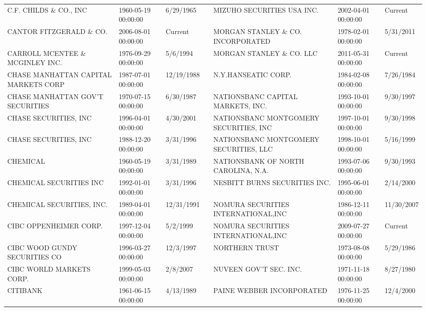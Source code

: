 \documentclass{article}
\begin{document}
\begin{tabular}{lllllll}
C.F. CHILDS \& CO., INC               & 1960-05-19 00:00:00 & 6/29/1965 &  & MIZUHO SECURITIES USA INC.          & 2002-04-01 00:00:00 & Current \\
CANTOR FITZGERALD \& CO. & 2006-08-01 00:00:00 & Current &  & MORGAN STANLEY \& CO. INCORPORATED   & 1978-02-01 00:00:00 & 5/31/2011 \\
CARROLL MCENTEE \& MCGINLEY INC.      & 1976-09-29 00:00:00 & 5/6/1994 &  & MORGAN STANLEY \& CO. LLC & 2011-05-31 00:00:00 & Current \\
CHASE MANHATTAN CAPITAL MARKETS CORP & 1987-07-01 00:00:00 & 12/19/1988 &  & N.Y.HANSEATIC CORP.             & 1984-02-08 00:00:00 & 7/26/1984 \\
CHASE MANHATTAN GOV'T SECURITIES     & 1970-07-15 00:00:00 & 6/30/1987 &  & NATIONSBANC CAPITAL MARKETS, INC.   & 1993-10-01 00:00:00 & 9/30/1997 \\
CHASE SECURITIES, INC               & 1996-04-01 00:00:00 & 4/30/2001 &  & NATIONSBANC MONTGOMERY SECURITIES, INC & 1997-10-01 00:00:00 & 9/30/1998 \\
CHASE SECURITIES, INC                & 1988-12-20 00:00:00 & 3/31/1996 &  & NATIONSBANC MONTGOMERY SECURITIES, LLC & 1998-10-01 00:00:00 & 5/16/1999 \\
CHEMICAL                            & 1960-05-19 00:00:00 & 3/31/1989 &  & NATIONSBANK OF NORTH CAROLINA, N.A. & 1993-07-06 00:00:00 & 9/30/1993 \\
CHEMICAL SECURITIES INC             & 1992-01-01 00:00:00 & 3/31/1996 &  & NESBITT BURNS SECURITIES INC.       & 1995-06-01 00:00:00 & 2/14/2000 \\
CHEMICAL SECURITIES, INC.           & 1989-04-01 00:00:00 & 12/31/1991 &  & NOMURA SECURITIES INTERNATIONAL,INC & 1986-12-11 00:00:00 & 11/30/2007 \\
CIBC OPPENHEIMER CORP.              & 1997-12-04 00:00:00 & 5/2/1999 &  & NOMURA SECURITIES INTERNATIONAL,INC & 2009-07-27 00:00:00 & Current \\
CIBC WOOD GUNDY SECURITIES CO       & 1996-03-27 00:00:00 & 12/3/1997 &  & NORTHERN TRUST                       & 1973-08-08 00:00:00 & 5/29/1986 \\
CIBC WORLD MARKETS CORP.            & 1999-05-03 00:00:00 & 2/8/2007 &  & NUVEEN GOV'T SEC. INC.               & 1971-11-18 00:00:00 & 8/27/1980 \\
CITIBANK                             & 1961-06-15 00:00:00 & 4/13/1989 &  & PAINE WEBBER INCORPORATED            & 1976-11-25 00:00:00 & 12/4/2000 \\

\end{tabular}
\end{document}
